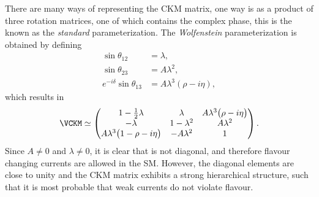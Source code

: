 There are many ways of representing the CKM matrix, one way is as a product of three rotation
matrices, one of which contains the complex phase, this is the known as the \emph{standard}
parameterization.
The \emph{Wolfenstein} parameterization is obtained by defining
\begin{align}
  \sin\theta_{12}&=\lambda, \nonumber\\
  \sin\theta_{23}&=A\lambda^2, \nonumber\\
  e^{-i\delta}\sin\theta_{13} &= A\lambda^3(\rho-i\eta),
\end{align}
which results in
\begin{align}
  \VCKM\simeq
    \begin{pmatrix}
      1-\tfrac12\lambda & \lambda & A\lambda^3\big(\rho-i\eta\big) \\
      -\lambda & 1-\lambda^2 & A\lambda^2 \\
      A\lambda^3\big(1-\rho-i\eta\big) & -A\lambda^2 & 1 \\
    \end{pmatrix}.
  \label{eq:th:wolfenstein}
\end{align}
Since $A\neq0$ and $\lambda\neq0$, it is clear that \VCKM is not diagonal, and therefore flavour
changing currents are allowed in the SM.
However, the diagonal elements are close to unity and the CKM matrix exhibits a strong
hierarchical structure, such that it is most probable that weak currents do not violate flavour.



